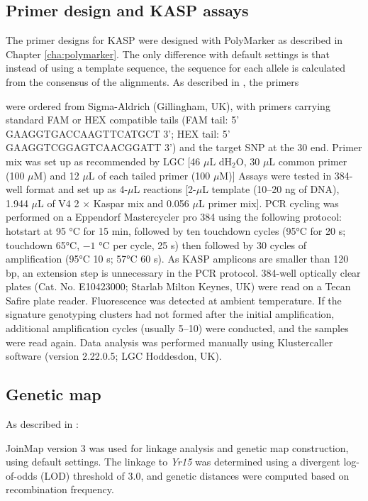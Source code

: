 \subsection{Primer design and KASP assays}
The primer designs for KASP were designed with PolyMarker as described in Chapter \ref{cha:polymarker}. 
The only difference with default settings is that instead of using a template sequence, the sequence for each allele is calculated from the consensus of the alignments. 
As described in \citet{Ramirez-Gonzalez2015b}, the primers 
\begin{blockquote} were ordered from Sigma-Aldrich (Gillingham, UK), with primers carrying standard FAM or HEX compatible tails (FAM tail: 5' GAAGGTGACCAAGTTCATGCT 3'; HEX tail: 5' GAAGGTCGGAGTCAACGGATT 3') and the target SNP at the 30 end. 
Primer mix was set up as recommended by LGC [46 $\mu$L dH$_{2}$O, 30 $\mu$L common primer (100 $\mu$M) and 12 $\mu$L of each tailed primer (100 $\mu$M)] \citep{LGC}
Assays were tested in 384-well format and set up as 4-$\mu$L reactions [2-$\mu$L template (10–20 ng of DNA), 1.944 $\mu$L of V4 2 $\times$ Kaspar mix and 0.056 $\mu$L primer mix]. 
PCR cycling was performed on a Eppendorf Mastercycler pro 384 using the following protocol: hotstart at 95 °C for 15 min, followed by ten touchdown cycles (95°C for 20 s; touchdown 65°C, $-1$ °C per cycle, 25 s) then followed by 30 cycles of amplification (95°C 10 s; 57°C 60 s).
As KASP amplicons are smaller than 120 bp, an extension step is unnecessary in the PCR protocol. 384-well optically clear plates (Cat. No. E10423000; Starlab Milton Keynes, UK) were read on a Tecan Safire plate reader. 
Fluorescence was detected at ambient temperature. If the signature genotyping clusters had not formed after the initial amplification, additional amplification cycles (usually 5–10) were conducted, and the samples were read again. Data analysis was performed manually using Klustercaller software (version 2.22.0.5; LGC Hoddesdon, UK).
\end{blockquote}


\subsection{Genetic map}
As described in \citet{Ramirez-Gonzalez2015b}:
\begin{blockquote}
 JoinMap version 3 \citep{vanOoijen2002} was used for linkage analysis and genetic map construction, using default settings. The linkage to \textit{Yr15} was determined using a divergent log-of-odds (LOD) threshold of 3.0, and genetic distances were computed based on recombination frequency. 
\end{blockquote}

